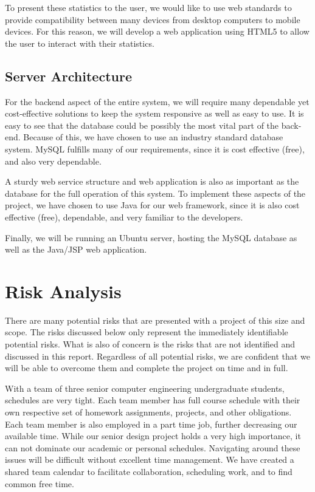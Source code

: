 \documentclass[12pt]{article}
\begin{document}
To present these statistics to the user, we would like to use web standards to provide compatibility between many devices from desktop computers to mobile devices.  For this reason, we will develop a web application using HTML5 to allow the user to interact with their statistics.

\subsection{Server Architecture}\label{subsec:ServerArchitecture}

For the backend aspect of the entire system, we will require many dependable yet cost-effective solutions to keep the system responsive as well as easy to use.  It is easy to see that the database could be possibly the most vital part of the back-end.  Because of this, we have chosen to use an industry standard database system.  MySQL fulfills many of our requirements, since it is cost effective (free), and also very dependable.

A sturdy web service structure and web application is also as important as the database for the full operation of this system.  To implement these aspects of the project, we have chosen to use Java for our web framework, since it is also cost effective (free), dependable, and very familiar to the developers.
 
Finally, we will be running an Ubuntu server, hosting the MySQL database as well as the Java/JSP web application.

\section{Risk Analysis}\label{sec:RiskAnalysis}

There are many potential risks that are presented with a project of this size and scope.   The risks discussed below only represent the immediately identifiable potential risks.  What is also of concern is the risks that are not identified and discussed in this report.  Regardless of all potential risks, we are confident that we will be able to overcome them and complete the project on time and in full.

With a team of three senior computer engineering undergraduate students, schedules are very tight.  Each team member has full course schedule with their own respective set of homework assignments, projects, and other obligations.  Each team member is also employed in a part time job, further decreasing our available time.  While our senior design project holds a very high importance, it can not dominate our academic or personal schedules.  Navigating around these issues will be difficult without excellent time management.  We have created a shared team calendar to facilitate collaboration, scheduling work, and to find common free time.
\end{document}

